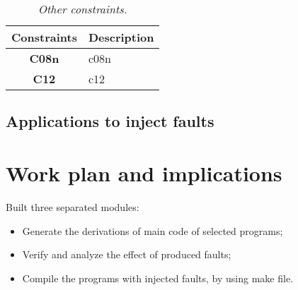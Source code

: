\begin{table}[!ht]
\centering
\begin{tabular}{|c|p{12cm}|}
\hline
\textbf{Constraints}            & \multicolumn{1}{c|}{\textbf{Description}}                                     \\ \hline \hline
\textbf{C08n}         & \Acl{c08n} \\ \hline
\textbf{C12}         & \Acl{c12} \\ \hline
\end{tabular}
\caption{\small \sl Other constraints.\label{tab:otherConstraints}}
\end{table}

\clearpage
\subsection{Applications to inject faults}


\newpage
\section{Work plan and implications}

Built three separated modules:

\begin{itemize}
	\item Generate the derivations of main code of selected programs;
	\item Verify and analyze the effect of produced faults;
	\item Compile the programs with injected faults, by using make file.
\end{itemize}






